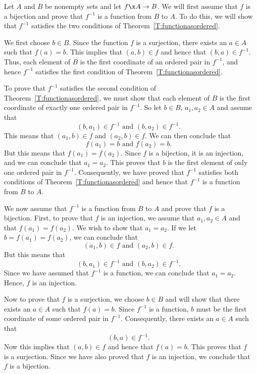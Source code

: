 \begin{myproof}
Let  $A$  and  $B$  be nonempty sets and let  $f\x A \to B$.  We will first assume that  $f$  is a bijection and prove that  $f^{ - 1} $ is a function from  $B$  to  $A$.  To do this, we will show that  $f^{ - 1} $ satisfies the two conditions of Theorem~\ref{T:functionasordered}.

We first choose  $b \in B$.  Since the function  $f$  is a surjection,  there exists an  
$a \in A$  such that  $f( a ) = b$.  This implies that  
$( {a, b} ) \in f$ and hence that  $( {b, a} ) \in f^{ - 1} $.  Thus, each element of  $B$  is the first coordinate of an ordered pair in  $f^{ - 1} $, and hence  
$f^{ - 1} $  satisfies the first condition of Theorem~\ref{T:functionasordered}.

To prove that  $f^{ - 1} $  satisfies the second condition of Theorem~\ref{T:functionasordered}, we must show that each element of  $B$  is the first coordinate of exactly one ordered pair in  $f^{ - 1} $.  So let  $b \in B$, $a_1 , a_2  \in A$
 and assume that  
\[
( {b, a_1 } ) \in f^{ - 1} \text{ and } ( {b, a_2 } ) \in f^{ - 1} .
\]
This means that  $( {a_1 , b} ) \in f$ and  $( {a_2 , b} ) \in f$.  We can then conclude that
\[
f( {a_1 } ) = b\text{ and }f( {a_2 } ) = b.
\]
But this means that  $f( {a_1 } ) = f( {a_2 } )$.  Since  $f$  is a bijection, it is an injection, and we can conclude that  $a_1  = a_2 $.  This proves that  $b$  is the first element of only one ordered pair in  $f^{ - 1} $.  Consequently, we have proved that  $f^{ - 1} $  satisfies both conditions of Theorem~\ref{T:functionasordered} and hence that  $f^{ - 1} $  is a function from  $B$  to  $A$.
\vskip6pt

We now assume that  $f^{ - 1} $  is a function from  $B$  to  $A$ and prove that  $f$  is a bijection. First, to prove that  $f$  is an injection, we assume that  $a_1 , a_2  \in A$ and that $f( {a_1 } ) = f( {a_2 } )$.  We wish to show that  $a_1  = a_2 $.  If we let  $b = f( {a_1 } ) = f( {a_2 } )$, we can conclude that
\[
( {a_1 , b} ) \in f \text{ and }( {a_2 , b} ) \in f.
\]
But this means that  
\[
( {b, a_1 } ) \in f^{ - 1} \text{ and }( {b, a_2 } ) \in f^{ - 1}. 
\]
Since we have assumed that  $f^{ - 1} $ is a function, we can conclude that  $a_1  = a_2 $.  Hence,  $f$  is an injection.

Now to prove that  $f$  is a surjection, we choose  $b \in B$ and will show that there exists an  $a \in A$ such that  $f( a ) = b$.  Since  $f^{ - 1} $  is a function,  $b$  must be the first coordinate of some ordered pair in  $f^{ - 1} $.  Consequently, there exists an  
$a \in A$  such that
\[
( {b, a} ) \in f^{ - 1} .
\]
Now this implies that  $( {a, b} ) \in f$ and hence that  $f( a ) = b$.  This proves that  $f$  is a surjection.  Since we have also proved that  $f$  is an injection, we conclude that  $f$  is a bijection.
\end{myproof}
\hbreak

\endinput
